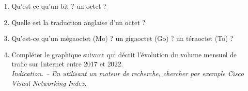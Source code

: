 \documentclass[a4paper]{article}
\begin{document}
\begin{enumerate}
  \item Qu'est-ce qu'un bit ? un octet ?
  \item Quelle est la traduction anglaise d'un octet ?
  \item Qu'est-ce qu'un mégaoctet (Mo) ? un gigaoctet (Go) ? un téraoctet (To) ?
  \item Compléter le graphique suivant qui décrit l'évolution du volume mensuel de trafic sur Internet entre 2017 et 2022.\\
    \textit{Indication. -- En utilisant un moteur de recherche, chercher par exemple \og{}Cisco Visual Networking Index\fg{}.}

%


\end{enumerate}
\end{document}
